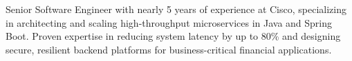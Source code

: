 \documentclass[10pt,a4paper,ragged2e, normalphoto]{altacv}
\begin{document}

\begin{fullwidth}
\makecvheader
\smallskip
Senior Software Engineer with nearly 5 years of experience at Cisco, specializing in architecting and scaling high-throughput microservices in Java and Spring Boot. Proven expertise in reducing system latency by up to 80\% and designing secure, resilient backend platforms for business-critical financial applications.\newline
\end{fullwidth}



\end{document}
